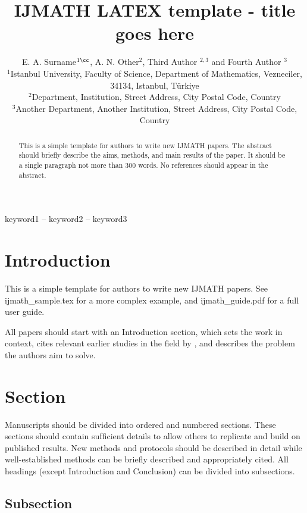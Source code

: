 \documentclass[referee,usenatbib]{ijmathtex}
\title[IJMATH Latex template]{IJMATH LATEX template - title goes here}
\author[Surname et. al]{%
E. A. Surname$^{1\cc}$,\orcid{0000-000X-XXXX-AAAA}
A. N. Other$^{2}$,\orcid{0000-000X-XXXX-BBBB}
Third Author $^{2,3}$\orcid{0000-000X-XXXX-CCCC}
and
Fourth Author $^{3}$\orcid{0000-000X-XXXX-DDDD}
\affsep \\
$^1$Istanbul University, Faculty of Science, Department of Mathematics, Vezneciler, 34134, Istanbul, T\"{u}rkiye\\
$^2$Department, Institution, Street Address, City Postal Code, Country\\
$^3$Another Department, Another Institution, Street Address, City Postal Code, Country
}
\date{
	\pSubmit{00.00.0000} 
	\pRevReq{00.00.0000}
	\pLastRevRec{00.00.0000}
	\pAccept{00.00.0000}
	\pPubOnl{00.00.0000}
}
\begin{document}
\label{firstpage}
\pagerange{\pageref*{firstpage}--\pageref*{lastpage}}
\maketitle

\begin{abstract}
This is a simple template for authors to write new IJMATH papers. The abstract should briefly describe the aims, methods, and main results of the paper. It should be a single paragraph not more than 300 words. No references should appear in the abstract.
\end{abstract}

\begin{keywords}
keyword1 -- keyword2 -- keyword3
\end{keywords}



\section{Introduction}
This is a simple template for authors to write new IJMATH papers. See ijmath\_sample.tex for a more complex example, and ijmath\_guide.pdf for a full user guide. 

All papers should start with an Introduction section, which sets the work in context, cites relevant earlier studies in the field by \cite{aut2018}, and describes the problem the authors aim to solve.
 

\section{Section}
Manuscripts should be divided into ordered and numbered sections. These sections should contain sufﬁcient details to allow others to replicate and build on published results. New methods and protocols should be described in detail while well-established methods can be brieﬂy described and appropriately cited. All headings (except Introduction and Conclusion) can be divided into subsections. 

\subsection{Subsection}
\end{document}
